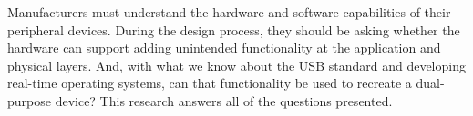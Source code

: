 Manufacturers must understand the hardware and software capabilities of their peripheral devices. During the design process, they should be asking whether the hardware can support adding unintended functionality at the application and physical layers. And, with what we know about the USB standard and developing real-time operating systems, can that functionality be used to recreate a dual-purpose device? This research answers all of the questions presented.